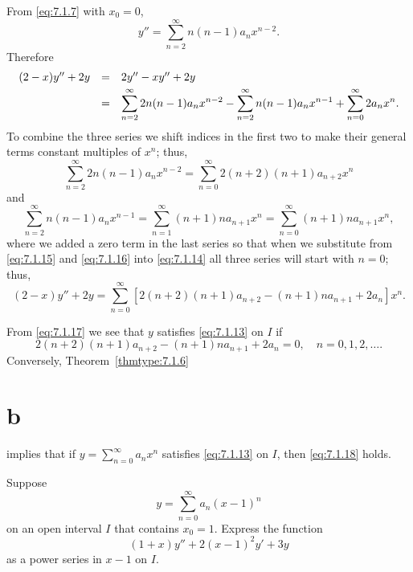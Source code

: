 \begin{examplesolution}
 From \eqref{eq:7.1.7} with $x_{0}=0$,
\[
  y''=\sum_{n=2}^{\infty}n(n-1)a_{n}x^{n-2}.
\]
Therefore
\begin{equation}
  \label{eq:7.1.14}
  \begin{array}{rcl}
    (2-x)y''+2y & = & 2y''-xy''+2y                                                                                                          \\[\jot]
                & = & \displaystyle{\sum_{n=2}^{\infty}2n(n-1)a_{n}x^{n-2} -\sum_{n=2}^{\infty}n(n-1)a_{n}x^{n-1} +\sum_{n=0}^{\infty}2a_{n}x^{n}}.
  \end{array}
\end{equation}
To combine the three series we shift indices in the first two to make their general terms constant
multiples of $x^{n}$; thus,
\begin{equation}
  \label{eq:7.1.15}\sum_{n=2}^{\infty}2n(n-1)a_{n}x^{n-2}=\sum_{n=0}^{\infty}2(n+2)(n+1)a_{n+2}x^{n}
\end{equation}
and
\begin{equation}
  \label{eq:7.1.16}\sum_{n=2}^{\infty}n(n-1)a_{n}x^{n-1}=\sum_{n=1}^{\infty}(n+1)na_{n+1}x^{n}=\sum_{n=0}^{\infty}(n+1)na_{n+1}x^{n},
\end{equation}
where we added a zero term in the last series so that when we substitute from \eqref{eq:7.1.15} and
\eqref{eq:7.1.16} into \eqref{eq:7.1.14} all three series will start with $n=0$; thus,
\begin{equation}
  \label{eq:7.1.17}(2-x)y''+2y=\sum_{n=0}^{\infty}[2(n+2)(n+1)a_{n+2}-(n+1)na_{n+1}+2a_{n}]x^{n}.
\end{equation}

 From \eqref{eq:7.1.17} we see that $y$ satisfies \eqref{eq:7.1.13} on $I$ if
\begin{equation}
  \label{eq:7.1.18}2(n+2)(n+1)a_{n+2}-(n+1)na_{n+1}+2a_{n}=0,\quad n=0,1,2,\dots.
\end{equation}
Conversely, Theorem~\ref{thmtype:7.1.6}~\part{b} implies that if $y=\sum_{n=0}^{\infty}a_{n}x^{n}$
satisfies \eqref{eq:7.1.13} on $I$, then \eqref{eq:7.1.18} holds.
\end{examplesolution}

\begin{example}
  \label{example:7.1.7} \rm Suppose
  \[
    y=\sum_{n=0}^{\infty}a_{n}(x-1)^{n}
  \]
  on an open interval $I$ that contains $x_{0}=1$. Express the function
  \begin{equation}
    \label{eq:7.1.19}(1+x)y''+2(x-1)^{2}y'+3y
  \end{equation}
  as a power series in $x-1$ on $I$.
\end{example}


